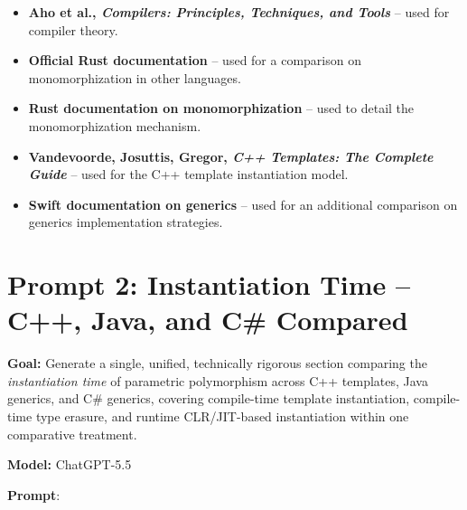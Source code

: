 \documentclass[11pt]{report}
\begin{document}
\begin{itemize}
    \item \textbf{Aho et al., \emph{Compilers: Principles, Techniques, and Tools}} \cite{aho2022} -- used for compiler theory.
    \item \textbf{Official Rust documentation} \cite{rust2024} -- used for a comparison on monomorphization in other languages.
    \item \textbf{Rust documentation on monomorphization} \cite{rust_monomorphization} -- used to detail the monomorphization mechanism.
    \item \textbf{Vandevoorde, Josuttis, Gregor, \emph{C++ Templates: The Complete Guide}} \cite{cpp_templates2017} -- used for the C++ template instantiation model.
    \item \textbf{Swift documentation on generics} \cite{swift_generics2019} -- used for an additional comparison on generics implementation strategies.
\end{itemize}

\section{Prompt 2: Instantiation Time -- C++, Java, and C\# Compared}
\label{Prompt 2 Instantiation}

\noindent\textbf{Goal:} Generate a single, unified, technically rigorous section comparing the \emph{instantiation time} of parametric polymorphism across C++ templates, Java generics, and C\# generics, covering compile-time template instantiation, compile-time type erasure, and runtime CLR/JIT-based instantiation within one comparative treatment.

\noindent\textbf{Model:} ChatGPT-5.5

\vspace{0.5em}

\vspace{0.5em}
\noindent\textbf{Prompt}:
\end{document}
